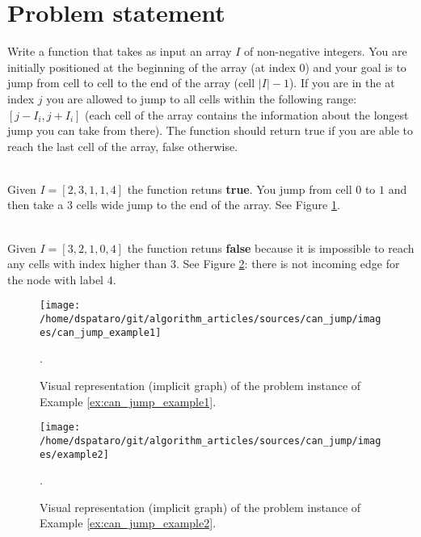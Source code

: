 \section{Problem statement}
\begin{exercise}
Write a function that takes as input  an array $I$ of non-negative integers. You are initially
positioned at the beginning of the array (at index $0$) and your goal is to jump from cell to cell
to the end of the array (cell $|I|-1$). If you are in the at index $j$ you are allowed to jump to
all cells within the following range: $[j-I_i,j+I_i]$ (each cell of the array contains the
information about the longest jump you can take from there). The function should return true if you
are able to reach the last cell of the array, false otherwise.

	\begin{example}
		\hfill \\
		Given  $I=[2,3,1,1,4]$ the function retuns \textbf{true}. You jump from cell $0$ to $1$ and
		then take a $3$ cells wide jump to the end of the array. See Figure
		\ref{fig:can_jump:example1}.
		\label{ex:can_jump_example1}
	\end{example}

	\begin{example}
		\hfill \\
		Given $I=[3,2,1,0,4]$ the function retuns \textbf{false} because it is impossible to reach
		any cells with index higher than $3$. See Figure \ref{fig:can_jump:example2}: there is not
		incoming edge for the node with label $4$.
		\label{ex:can_jump_example2}
	\end{example}
\end{exercise}

\begin{figure}
	\centering
	\texttt{[image: /home/dspataro/git/algorithm\_articles/sources/can\_jump/images/can\_jump\_example1]}
	\caption[Implicit graph for the Example \ref{ex:can_jump_example1}.]
	{Visual representation (implicit graph) of the problem instance of Example
	\ref{ex:can_jump_example1}.}.
	\label{fig:can_jump:example1}
\end{figure}

\begin{figure}
	\centering
	\texttt{[image: /home/dspataro/git/algorithm\_articles/sources/can\_jump/images/example2]}
	\caption[Implicit graph for the Example \ref{ex:can_jump_example2}.]
	{Visual representation (implicit graph) of the problem instance of Example
	\ref{ex:can_jump_example2}.}.
	\label{fig:can_jump:example2}
\end{figure}

